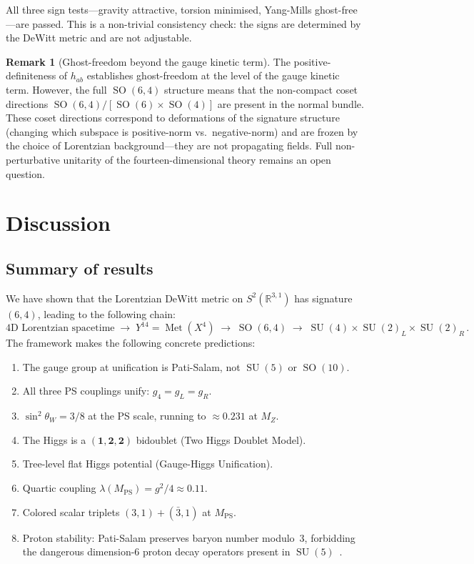 \documentclass[12pt,a4paper]{article}
\theoremstyle{definition}
\newtheorem{remark}[theorem]{Remark}
\newcommand{\Met}{\operatorname{Met}}
\newcommand{\SO}{\operatorname{SO}}
\newcommand{\SU}{\operatorname{SU}}
\newcommand{\R}{\mathbb{R}}
\begin{document}
All three sign tests---gravity attractive, torsion minimised, Yang-Mills ghost-free---are passed.
This is a non-trivial consistency check: the signs are determined by the DeWitt metric and are not adjustable.

\begin{remark}[Ghost-freedom beyond the gauge kinetic term]
\label{rem:ghosts}
The positive-definiteness of $h_{ab}$ establishes ghost-freedom at the level of the gauge kinetic term.
However, the full $\SO(6,4)$ structure means that the non-compact coset directions $\SO(6,4)/[\SO(6) \times \SO(4)]$ are present in the normal bundle.
These coset directions correspond to deformations of the signature structure (changing which subspace is positive-norm vs.\ negative-norm) and are frozen by the choice of Lorentzian background---they are not propagating fields.
Full non-perturbative unitarity of the fourteen-dimensional theory remains an open question.
\end{remark}


\section{Discussion}
\label{sec:discussion}

\subsection{Summary of results}

We have shown that the Lorentzian DeWitt metric on $S^2(\R^{3,1})$ has signature~$(6,4)$, leading to the following chain:
\begin{equation*}
\text{4D Lorentzian spacetime} \;\to\; Y^{14} = \Met(X^4) \;\to\; \SO(6,4) \;\to\; \SU(4) \times \SU(2)_L \times \SU(2)_R\,.
\end{equation*}
The framework makes the following concrete predictions:
\begin{enumerate}[nosep]
\item The gauge group at unification is Pati-Salam, not $\SU(5)$ or $\SO(10)$.
\item All three PS couplings unify: $g_4 = g_L = g_R$.
\item $\sin^2\theta_W = 3/8$ at the PS scale, running to $\approx 0.231$ at $M_Z$.
\item The Higgs is a $(\mathbf{1},\mathbf{2},\mathbf{2})$ bidoublet (Two Higgs Doublet Model).
\item Tree-level flat Higgs potential (Gauge-Higgs Unification).
\item Quartic coupling $\lambda(M_{\mathrm{PS}}) = g^2/4 \approx 0.11$.
\item Colored scalar triplets $(3,1) + (\bar{3},1)$ at $M_{\mathrm{PS}}$.
\item Proton stability: Pati-Salam preserves baryon number modulo~3, forbidding the dangerous dimension-6 proton decay operators present in $\SU(5)$~\cite{PatiSalam1974}.
\end{enumerate}
\end{document}
